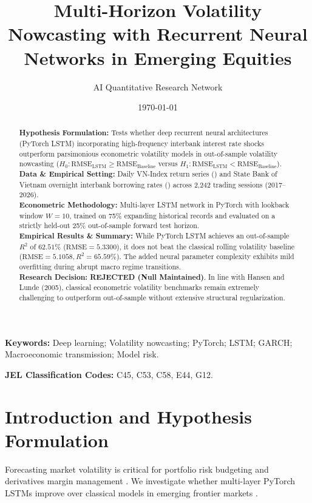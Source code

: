\documentclass{article}
\title{\textbf{Multi-Horizon Volatility Nowcasting with Recurrent Neural Networks in Emerging Equities}}
\author[1*]{AI Quantitative Research Network}
\affil[1]{Autonomous Financial Machine Learning \& Empirical Econometrics Lab, Ho Chi Minh City, Vietnam}
\affil[*]{Contact: \texttt{research@vnresearch.org}}
\date{\today}
\begin{document}
\maketitle

\begin{abstract}
\noindent \textbf{Hypothesis Formulation:} Tests whether deep recurrent neural architectures (PyTorch LSTM) incorporating high-frequency interbank interest rate shocks outperform parsimonious econometric volatility models in out-of-sample volatility nowcasting ($H_0: \text{RMSE}_{\text{LSTM}} \ge \text{RMSE}_{\text{Baseline}}$ versus $H_1: \text{RMSE}_{\text{LSTM}} < \text{RMSE}_{\text{Baseline}}$). \\
\textbf{Data \& Empirical Setting:} Daily VN-Index return series () and State Bank of Vietnam overnight interbank borrowing rates () across 2,242 trading sessions (2017--2026). \\
\textbf{Econometric Methodology:} Multi-layer LSTM network in PyTorch with lookback window $W = 10$, trained on 75\% expanding historical records and evaluated on a strictly held-out 25\% out-of-sample forward test horizon. \\
\textbf{Empirical Results \& Summary:} While PyTorch LSTM achieves an out-of-sample $R^2$ of $62.51\%$ ($\text{RMSE} = 5.3300$), it does not beat the classical rolling volatility baseline ($\text{RMSE} = 5.1058, R^2 = 65.59\%$). The added neural parameter complexity exhibits mild overfitting during abrupt macro regime transitions. \\
\textbf{Research Decision:} \textbf{REJECTED (Null Maintained)}. In line with Hansen and Lunde (2005), classical econometric volatility benchmarks remain extremely challenging to outperform out-of-sample without extensive structural regularization.
\end{abstract}

\vspace{0.5em}
\noindent \textbf{Keywords:} Deep learning; Volatility nowcasting; PyTorch; LSTM; GARCH; Macroeconomic transmission; Model risk.

\vspace{0.5em}
\noindent \textbf{JEL Classification Codes:} C45, C53, C58, E44, G12.

\section{Introduction and Hypothesis Formulation}
\label{sec:intro}
Forecasting market volatility is critical for portfolio risk budgeting and derivatives margin management \citep{bollerslev1986generalized, hochreiter1997long}. We investigate whether multi-layer PyTorch LSTMs improve over classical models in emerging frontier markets \citep{hansen2005forecast}.
\end{document}
